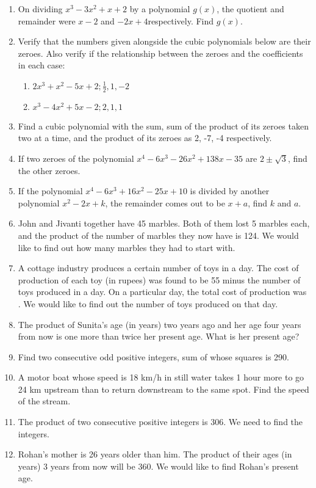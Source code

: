 \begin{enumerate}[label=\arabic*.,ref=\thesubsection.\theenumi]
\item On dividing $x^3-3x^2+x+2$ by a polynomial $g(x)$, the quotient and remainder were $x-2$ and $-2x+4$respectively.  Find $g(x)$.
\item Verify that the numbers given alongside the cubic polynomials below are their zeroes.  Also verify if the relationship between the zeroes and the coefficients in each case:
\begin{enumerate}
\item $2x^3+x^2-5x+2; \frac{1}{2}, 1, -2$
\item $x^3-4x^2+5x-2; 2, 1, 1$
\end{enumerate}
\item Find a cubic polynomial with the sum, sum of the product of its zeroes taken two at a time, and the product of its zeroes as 2, -7, -4 respectively.
\item If two zeroes of the polynomial $x^4-6x^3-26x^2+138x-35$ are $2\pm \sqrt{3}$, find the other zeroes.\item If the polynomial $x^4-6x^3+16x^2-25x+10$ is divided by another polynomial $x^2-2x+k$, the remainder comes out to be $x+a$, find $k$ and $a$.
\item John and Jivanti together have 45 marbles. Both of them lost 5 marbles each, and the product of the number of marbles they now have is 124. We would like to find out how many marbles they had to start with.
\item  A cottage industry produces a certain number of toys in a day. The cost of production of each toy (in rupees) was found to be 55 minus the number of toys produced in a day. On a particular day, the total cost of production was . We would like to find out the number of toys produced on that day.
\item The product of Sunita’s age (in years) two years ago and her age four years from now is one more than twice her present age. What is her present age?
\item Find two consecutive odd positive integers, sum of whose squares is 290.
\item A motor boat whose speed is 18 km/h in still water takes 1 hour more to go 24 km upstream than to return downstream to the same spot. Find the speed of the stream.
%
\item The product of two consecutive positive integers is 306. We need to find the integers.
\item Rohan’s mother is 26 years older than him. The product of their ages (in years) 3 years from now will be 360. We would like to find Rohan’s present age.

\end{enumerate}
